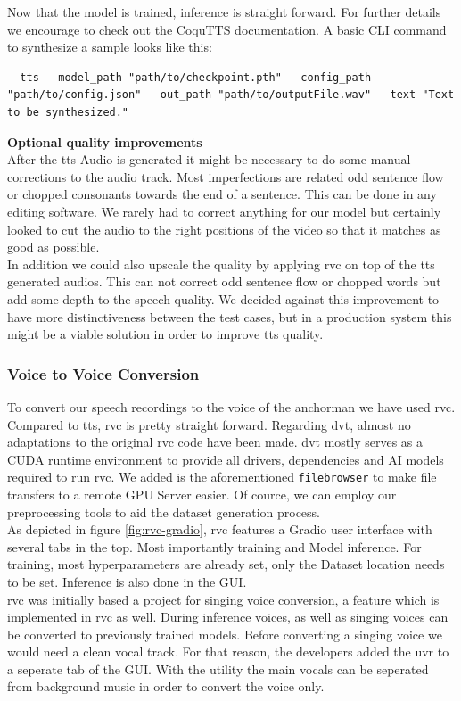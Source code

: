 \documentclass[
  a4paper,  %
  twoside,  %
  bibliography=totoc,
  headsepline,
  cleardoublepage=empty,
  parskip=half,
  draft=false
]{scrbook}
\begin{document}
Now that the model is trained, inference is straight forward. For further details we encourage to check out the CoquTTS documentation. A basic CLI command to synthesize a sample looks like this:
\begin{lstlisting}
  tts --model_path "path/to/checkpoint.pth" --config_path "path/to/config.json" --out_path "path/to/outputFile.wav" --text "Text to be synthesized."
\end{lstlisting}

\textbf{Optional quality improvements} \\
After the \gls{tts} Audio is generated it might be necessary to do some manual corrections to the audio track. Most imperfections are related odd sentence flow or chopped consonants towards the end of a sentence. This can be done in any editing software. We rarely had to correct anything for our model but certainly looked to cut the audio to the right positions of the video so that it matches as good as possible. \\
In addition we could also upscale the quality by applying \gls{rvc} on top of the \gls{tts} generated audios. This can not correct odd sentence flow or chopped words but add some depth to the speech quality. We decided against this improvement to have more distinctiveness between the test cases, but in a production system this might be a viable solution in order to improve \gls{tts} quality. 

\subsubsection{Voice to Voice Conversion}
To convert our speech recordings to the voice of the anchorman we have used \gls{rvc}. Compared to \gls{tts}, \gls{rvc} is pretty straight forward. Regarding \gls*{dvt}, almost no adaptations to the original \gls*{rvc} \cite*{RVCProjectRetrievalbasedVoiceConversionWebUI2023} code have been made. \gls*{dvt} mostly serves as a CUDA runtime environment to provide all drivers, dependencies and AI models required to run \gls{rvc}. We added is the aforementioned \verb|filebrowser| to make file transfers to a remote GPU Server easier. Of cource, we can employ our preprocessing tools to aid the dataset generation process.\\
As depicted in figure \ref{fig:rvc-gradio}, \gls{rvc} features a Gradio user interface with several tabs in the top. Most importantly training and Model inference. For training, most hyperparameters are already set, only the Dataset location needs to be set. Inference is also done in the GUI. \\
\gls{rvc} was initially based a project for singing voice conversion, a feature which is implemented in \gls{rvc} as well. During inference voices, as well as singing voices can be converted to previously trained models. Before converting a singing voice we would need a clean vocal track. For that reason, the developers added the \gls{uvr} to a seperate tab of the GUI. With the utility the main vocals can be seperated from background music in order to convert the voice only.
\end{document}
